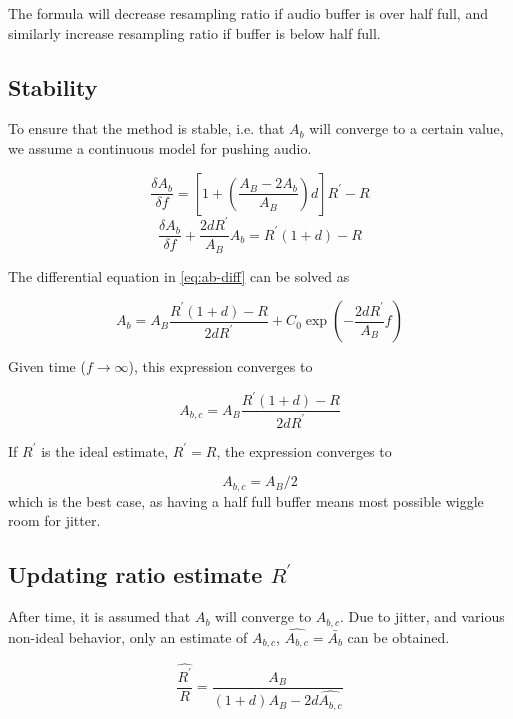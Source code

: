 \documentclass[11pt, a4paper]{article}
\begin{document}
The formula will decrease resampling ratio if audio buffer is over half full, and similarly increase
resampling ratio if buffer is below half full.

\subsection{Stability}

To ensure that the method is stable, i.e. that $A_b$ will converge to a certain value,
we assume a continuous model for pushing audio.

\begin{equation}
\frac{\delta A_b}{\delta f} = \left[ 1 + \left(\frac{A_B - 2A_b}{A_B}\right) d \right] R^{'} - R
\end{equation}
\begin{equation} \label{eq:ab-diff}
\frac{\delta A_b}{\delta f} + \frac{2dR^{'}}{A_B}A_b = R^{'} \left(1 + d\right) - R
\end{equation}

The differential equation in \eqref{eq:ab-diff} can be solved as

\begin{equation}
A_b = A_B \frac{R^{'}\left(1 + d\right) - R}{2dR^{'}} + C_0\exp \left(-\frac{2dR^{'}}{A_B} f\right)
\end{equation}

Given time ($f \rightarrow \infty$), this expression converges to

\begin{equation}
A_{b,c} = A_B \frac{R^{'}\left(1 + d\right) - R}{2dR^{'}}
\end{equation}

If $R^{'}$ is the ideal estimate, $R^{'} = R$, the expression converges to

\begin{equation}
A_{b,c} = A_B / 2
\end{equation}
which is the best case, as having a half full buffer means most possible wiggle room for jitter.

\subsection{Updating ratio estimate $R^{'}$}
After time, it is assumed that $A_b$ will converge to $A_{b,c}$.
Due to jitter, and various non-ideal behavior, only an estimate of $A_{b,c}$, $\hat{A_{b,c}} = \bar{A_b}$ can be obtained.

\begin{equation}
\frac{\hat{R^{'}}}{R} = \frac{A_B}{\left(1 + d\right) A_B - 2d\hat{A_{b,c}}}
\end{equation}
\end{document}
